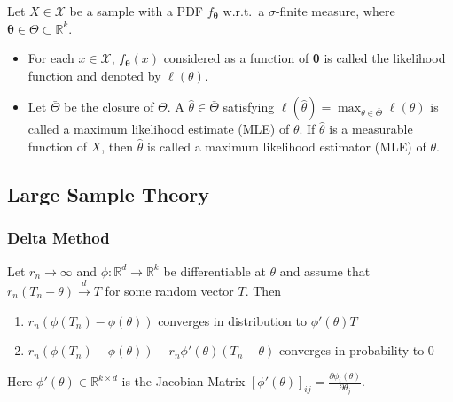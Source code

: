 \begin{exam}
Let $X \in \mathcal{X}$ be a sample with a PDF $f_{\boldsymbol{\theta}}$ w.r.t.\ a $\sigma$-finite measure, where $\boldsymbol{\theta} \in \Theta \subset \mathbb{R}^k$.

\begin{itemize}
    \item For each $x \in \mathcal{X}$, $f_{\boldsymbol{\theta}}(x)$ considered as a function of $\boldsymbol{\theta}$ is called the likelihood function and denoted by $\ell(\theta)$.
    
    \item Let $\bar{\Theta}$ be the closure of $\Theta$. A $\hat{\theta} \in \bar{\Theta}$ satisfying $\ell(\hat{\theta}) = \max_{\theta \in \bar{\Theta}} \ell(\theta)$ is called a maximum likelihood estimate (MLE) of $\theta$. If $\hat{\theta}$ is a measurable function of $X$, then $\hat{\theta}$ is called a maximum likelihood estimator (MLE) of $\theta$.
\end{itemize}
\end{exam}

\subsection{Large Sample Theory}
\subsubsection{Delta Method}
\begin{thm}
Let $r_n \to \infty$ and $\phi: \mathbb{R}^d \to \mathbb{R}^k$ be differentiable at $\theta$ and assume that $r_n(T_n - \theta) \xrightarrow{d} T$ for some random vector $T$. Then
\begin{enumerate}
    \item $r_n(\phi(T_n) - \phi(\theta))$ converges in distribution to $\phi'(\theta) T$
    \item $r_n(\phi(T_n) - \phi(\theta)) - r_n \phi'(\theta)(T_n - \theta)$ converges in probability to $0$
\end{enumerate}
Here $\phi'(\theta) \in \mathbb{R}^{k \times d}$ is the Jacobian Matrix $[\phi'(\theta)]_{ij} = \frac{\partial \phi_i(\theta)}{\partial \theta_j}$.
\end{thm}

